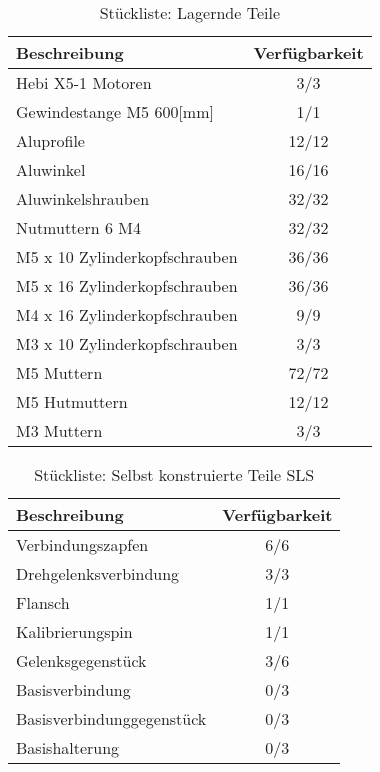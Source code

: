 \documentclass[Bachelor, BMR, ngerman]{twbook}
\begin{document}
     \begin{table}[!htbp]
        \centering
        \caption{Stückliste: Lagernde Teile}\label{tab2}
            
            \begin{tabular}{| l | c |}\hline \rowcolor[gray]{0.8}
                Beschreibung & Verfügbarkeit\\\hline
                
                Hebi X5-1 Motoren & 3/3\\\hline
                Gewindestange M5 600[mm] & 1/1\\\hline
                Aluprofile & 12/12\\\hline
                Aluwinkel & 16/16\\\hline
                Aluwinkelshrauben & 32/32\\\hline
                Nutmuttern 6 M4 & 32/32\\\hline
                M5 x 10 Zylinderkopfschrauben & 36/36\\\hline
                M5 x 16 Zylinderkopfschrauben & 36/36\\\hline
                M4 x 16 Zylinderkopfschrauben & 9/9\\\hline
                M3 x 10 Zylinderkopfschrauben & 3/3\\\hline
                M5 Muttern & 72/72\\\hline
                M5 Hutmuttern & 12/12\\\hline
                M3 Muttern & 3/3\\\hline
                \end{tabular}
    \end{table}
    
    \begin{table}[!htbp]
        \centering
        \caption{Stückliste: Selbst konstruierte Teile SLS}\label{tab3}
            \begin{tabular}{| l | c |}\hline \rowcolor[gray]{0.8}
                Beschreibung & Verfügbarkeit\\\hline
                
                Verbindungszapfen & 6/6\\\hline
                Drehgelenksverbindung & 3/3\\\hline
                Flansch & 1/1\\\hline
                Kalibrierungspin & 1/1\\\hline
                Gelenksgegenstück & 3/6\\\hline
                Basisverbindung & 0/3\\\hline
                Basisverbindunggegenstück & 0/3\\\hline
                Basishalterung & 0/3\\\hline
            \end{tabular}
    \end{table}
    
\end{document}
